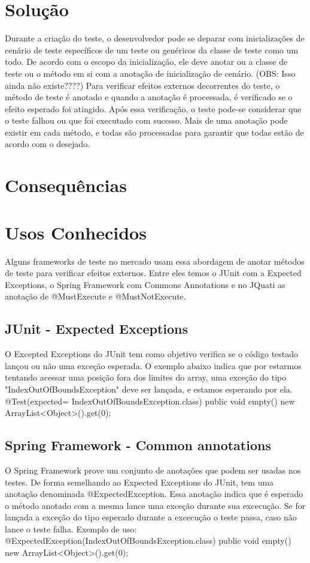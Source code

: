 \documentclass[12pt,a4paper,oneside]{book}
\begin{document}
\section{Solução}
Durante a criação do teste, o desenvolvedor pode se deparar com inicializações de cenário de teste específicos de um teste ou genéricos da classe de teste como um todo. De acordo com o escopo da inicialização, ele deve anotar ou a classe de teste ou o método em si com a anotação de inicialização de cenário. (OBS: Isso ainda não existe????)
Para verificar efeitos externos decorrentes do teste, o método de teste é anotado e quando a anotação é processada, é verificado se o efeito esperado foi atingido. Após essa verificação, o teste pode-se considerar que o teste falhou ou que foi executado com sucesso. Mais de uma anotação pode existir em cada método, e todas são processadas para garantir que todas estão de acordo com o desejado.

\section{Consequências}

\section{Usos Conhecidos}
Alguns frameworks de teste no mercado usam essa abordagem de anotar métodos de teste para verificar efeitos externos. Entre eles temos o JUnit com a Expected Exceptions, o Spring Framework com Commons Annotations e no JQuati as anotação de @MustExecute e @MustNotExecute.

\subsection{JUnit - Expected Exceptions}
O Excepted Exceptions do JUnit tem como objetivo verifica se o código testado lançou ou não uma exceção esperada.
O exemplo abaixo indica que por estarmos tentando acessar uma posição fora dos limites do array, uma exceção do tipo "IndexOutOfBoundsException" deve ser lançada, e estamos esperando por ela.
@Test(expected= IndexOutOfBoundsException.class) public void empty() { 
    new ArrayList<Object>().get(0); 
}

\subsection{Spring Framework - Common annotations}
O Spring Framework prove um conjunto de anotações que podem ser usadas nos testes. De forma semelhando ao Expected Exceptions do JUnit, tem uma anotação denominada @ExpectedException. 
Essa anotação indica que é esperado o método anotado com a mesma lance uma exceção durante sua excecução. Se for lançada a exceção do tipo esperado durante a excecução o teste passa, caso não lance o teste falha.
Exemplo de uso:
@ExpectedException(IndexOutOfBoundsException.class)
public void empty() {
   new ArrayList<Object>().get(0);
}
\end{document}
